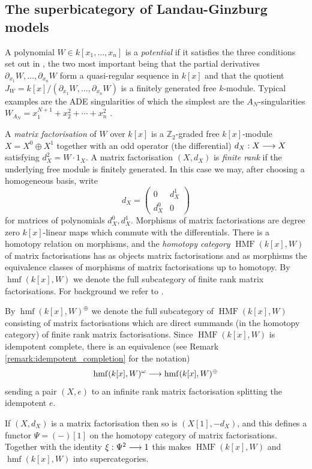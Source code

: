 \documentclass[english,letter paper,12pt,leqno]{article}
\theoremstyle{example}
\numberwithin{equation}{section}
\def\be{\begin{equation}}
\def\ee{\end{equation}}
\DeclareMathOperator{\hmf}{hmf}
\DeclareMathOperator{\HMF}{HMF}
\begin{document}
\subsection{The superbicategory of Landau-Ginzburg models}\label{section:superbicatLG}

A polynomial $W \in k[x_1,\ldots,x_n]$ is a \emph{potential} if it satisfies the three conditions set out in \cite[Section 2.2]{lgdual}, the two most important being that the partial derivatives $\partial_{x_1} W, \ldots, \partial_{x_n} W$ form a quasi-regular sequence in $k[x]$ and that the quotient $J_W = k[x]/(\partial_{x_1} W, \ldots, \partial_{x_n} W)$ is a finitely generated free $k$-module. Typical examples are the ADE singularities \cite[I \S 2.4]{greuel} of which the simplest are the $A_N$-singularities $W_{A_N} = x_1^{N+1} + x_2^2 + \cdots + x_n^2$ .

A \emph{matrix factorisation} of $W$ over $k[x]$ is a $\mathbb{Z}_2$-graded free $k[x]$-module $X = X^0 \oplus X^1$ together with an odd operator (the differential) $d_X: X \longrightarrow X$ satisfying $d_X^2 = W \cdot 1_X$. A matrix factorisation $(X,d_X)$ is \emph{finite rank} if the underlying free module is finitely generated. In this case we may, after choosing a homogeneous basis, write
\[
d_X = \begin{pmatrix} 0 & d_X^1 \\ d_X^0 & 0 \end{pmatrix}
\]
for matrices of polynomials $d_X^0, d_X^1$. Morphisms of matrix factorisations are degree zero $k[x]$-linear maps which commute with the differentials. There is a homotopy relation on morphisms, and the \emph{homotopy category} $\HMF(k[x],W)$ of matrix factorisations has as objects matrix factorisations and as morphisms the equivalence classes of morphisms of matrix factorisations up to homotopy. By $\hmf(k[x],W)$ we denote the full subcategory of finite rank matrix factorisations. For background we refer to \cite{yoshino98}.

By $\hmf(k[x],W)^{\oplus}$ we denote the full subcategory of $\HMF(k[x],W)$ consisting of matrix factorisations which are direct summands (in the homotopy category) of finite rank matrix factorisations. Since $\HMF(k[x],W)$ is idempotent complete, there is an equivalence (see Remark \ref{remark:idempotent_completion} for the notation)
\be\label{eq:omegavsoplus}
\hmf(k[x],W)^\omega \lto \hmf(k[x],W)^{\oplus}
\ee
sending a pair $(X,e)$ to an infinite rank matrix factorisation splitting the idempotent $e$.

If $(X,d_X)$ is a matrix factorisation then so is $(X[1], -d_X)$, and this defines a functor $\Psi = (-)[1]$ on the homotopy category of matrix factorisations. Together with the identity $\xi: \Psi^2 \longrightarrow 1$ this makes $\HMF(k[x],W)$ and $\hmf(k[x],W)$ into supercategories.
\end{document}
